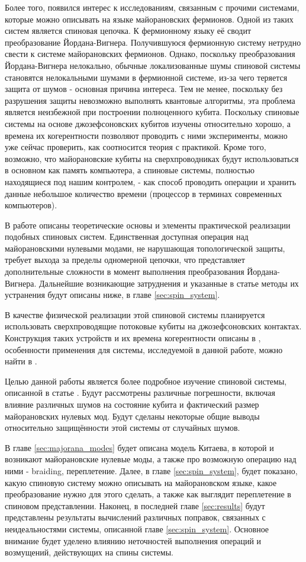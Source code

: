 \documentclass[a4paper,12pt]{article}
\theoremstyle{plain} %
\theoremstyle{definition} %
\theoremstyle{remark} %
\begin{document}
Более того, появился интерес к исследованиям, связанным с прочими системами, которые можно описывать на языке майорановских фермионов. Одной из таких систем является спиновая цепочка. К фермионному языку её сводит преобразование Йордана-Вигнера. Получившуюся фермионную систему нетрудно свести к системе майорановских фермионов. Однако, поскольку преобразования Йордана-Вигнера нелокально, обычные локализованные шумы спиновой системы становятся нелокальными шумами в фермионной системе, из-за чего теряется защита от шумов - основная причина интереса. Тем не менее, поскольку без разрушения защиты невозможно выполнять квантовые алгоритмы, эта проблема является неизбежной при построении полноценного кубита. Поскольку спиновые системы на основе джозефсоновских кубитов изучены относительно хорошо, а времена их когерентности позволяют проводить с ними эксперименты, можно уже сейчас проверить, как соотносится теория с практикой. Кроме того, возможно, что майорановские кубиты на сверхпроводниках будут использоваться в основном как память компьютера, а спиновые системы, полностью находящиеся под нашим контролем, - как способ проводить операции и хранить данные небольшое количество времени (процессор в терминах современных компьютеров).

В работе \cite{main} описаны теоретические основы и элементы практической реализации подобных спиновых систем. Единственная доступная операция над майорановскими нулевыми модами, не нарушающая топологической защиты, требует выхода за пределы одномерной цепочки, что представляет дополнительные сложности в момент выполнения преобразования Йордана-Вигнера. Дальнейшие возникающие затруднения и указанные в статье методы их устранения будут описаны ниже, в главе \ref{sec:spin_system}.

В качестве физической реализации этой спиновой системы планируется использовать сверхпроводящие потоковые кубиты на джозефсоновских контактах. Конструкция таких устройств и их времена когерентности описаны в \cite{flux_qubit}, особенности применения для системы, исследуемой в данной работе, можно найти в \cite{main}.

Целью данной работы является более подробное изучение спиновой системы, описанной в статье \cite{main}. Будут рассмотрены различные погрешности, включая влияние различных шумов на состояние кубита и фактический размер майорановских нулевых мод. Будут сделаны некоторые общие выводы относительно защищённости этой системы от случайных шумов.

В главе \ref{sec:majorana_modes} будет описана модель Китаева, в которой и возникают майорановские нулевые моды, а также про возможную операцию над ними - braiding, переплетение. Далее, в главе \ref{sec:spin_system}, будет показано, какую спиновую систему можно описывать на майорановском языке, какое преобразование нужно для этого сделать, а также как выглядит переплетение в спиновом представлении. Наконец, в последней главе \ref{sec:results} будут представлены результаты вычислений различных поправок, связанных с неидеальностями системы, описанной главе \ref{sec:spin_system}. Основное внимание будет уделено влиянию неточностей выполнения операций и возмущений, действующих на спины системы.
\end{document}

